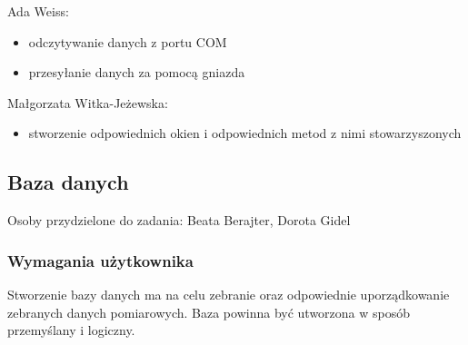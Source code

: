 \documentclass{article}
\begin{document}
Ada Weiss:
\begin{itemize}
\item odczytywanie danych z portu COM
\item przesyłanie danych za pomocą gniazda
\end{itemize}
Małgorzata Witka-Jeżewska:
\begin{itemize}
    \item stworzenie odpowiednich okien i odpowiednich metod z nimi stowarzyszonych
\end{itemize}


\subsection{Baza danych}
Osoby przydzielone do zadania: Beata Berajter, Dorota Gidel
\subsubsection{Wymagania użytkownika}
Stworzenie bazy danych ma na celu zebranie oraz odpowiednie uporządkowanie zebranych danych pomiarowych. Baza powinna być utworzona w sposób przemyślany i logiczny.
\end{document}
